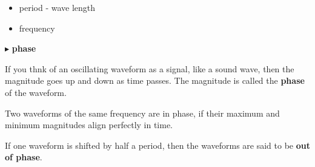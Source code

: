 \documentclass{ximera}
\begin{document}
\begin{itemize}
\item period - wave length
\item frequency
\end{itemize}





$\blacktriangleright$ \textbf{phase}

If you thnk of an oscillating waveform as a signal, like a sound wave, then the magnitude goes up and down as time passes. The magnitude is called the \textbf{phase} of the waveform.

Two waveforms of the same frequency are in phase, if their maximum and minimum magnitudes align perfectly in time.

If one waveform is shifted by half a period, then the waveforms are said to be \textbf{out of phase}.




\begin{center}
\end{center}
\end{document}
